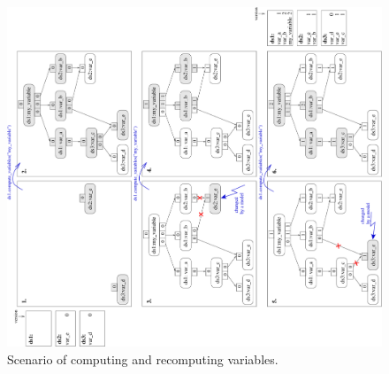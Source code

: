{\begin{figure}
\begin{center}
\includegraphics[scale=0.55, angle=-90]{images/variabletree1.pdf}
\caption{\label{fig:opus-core-variable-tree-1}\small Scenario of computing and
  recomputing variables.}
\end{center}
\end{figure}

}
